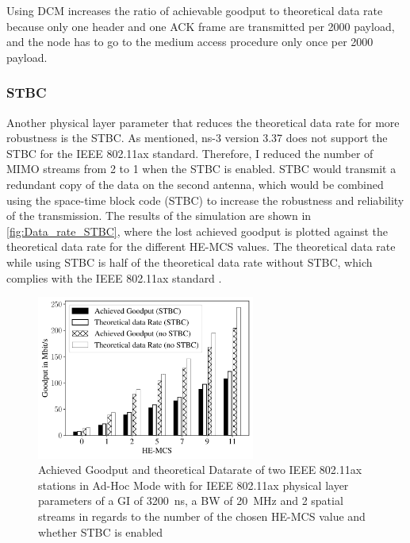 Using \ac{DCM} increases the ratio of achievable goodput to theoretical data rate because only one header and one ACK frame are transmitted per
\SI{2000}{\byte} payload, and the node has to go to the medium access procedure only once per \SI{2000}{\byte} payload.

\subsubsection*{\acf{STBC}}
\label{sec:STBCDataRate}
Another physical layer parameter that reduces the theoretical data rate for more robustness is the \ac{STBC}.
As mentioned, ns-3 version 3.37 does not support the \ac{STBC} for the IEEE 802.11ax standard.
Therefore, I reduced the number of
\ac{MIMO} streams from \num{2} to \num{1} when the \ac{STBC} is enabled. \ac{STBC} would transmit a redundant copy of the data on the second antenna, which would be combined
using the space-time block code (STBC) to increase the robustness and reliability of the transmission.
The results of the simulation are shown in \autoref{fig:Data_rate_STBC}, where the lost achieved goodput is plotted against
the theoretical data rate for the different \ac{HE}-\ac{MCS} values.
The theoretical data rate while using \ac{STBC} is half of the theoretical data rate without \ac{STBC},
which complies with the IEEE 802.11ax standard \cite{ieee_standard_2021ax}.
\begin{figure}[H]%
   \centering
   \includegraphics[width=0.64\textwidth]{figures/STBC_dataRate_simulation}
   \caption{Achieved Goodput and theoretical Datarate of two IEEE 802.11ax stations in Ad-Hoc Mode with for IEEE 802.11ax physical layer parameters of a \acf{GI} of \SI{3200}{\nano\second}, a \acf{BW} of \SI{20}{\mega\hertz} and 2 spatial streams  in regards to the number of the chosen \ac{HE}-\acf{MCS} value and whether \acf{STBC} is enabled}%
   \label{fig:Data_rate_STBC}%
\end{figure}

